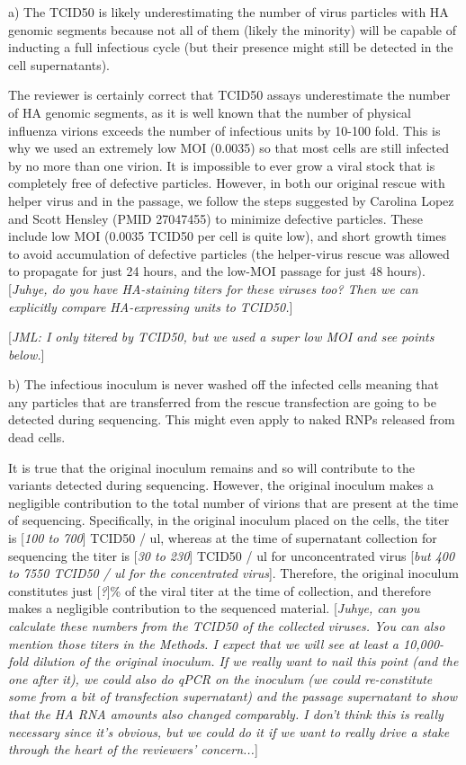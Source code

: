 \documentclass[11pt, oneside]{article}   	%
\newcommand{\comment}[1]{{\color{red}[\textsl{#1}]}}
\newcommand{\response}[1]{{\color{black}#1}}
\begin{document}
a) The TCID50 is likely underestimating the number of virus particles with HA genomic segments because not all of them (likely the minority) will be capable of inducting a full infectious cycle (but their presence might still be detected in the cell supernatants). 

\response{The reviewer is certainly correct that TCID50 assays underestimate the number of HA genomic segments, as it is well known that the number of physical influenza virions exceeds the number of infectious units by 10-100 fold.
This is why we used an extremely low MOI (0.0035) so that most cells are still infected by no more than one virion.
It is impossible to ever grow a viral stock that is completely free of defective particles.
However, in both our original rescue with helper virus and in the passage, we follow the steps suggested by Carolina Lopez and Scott Hensley (PMID 27047455) to minimize defective particles.
These include low MOI (0.0035 TCID50 per cell is quite low), and short growth times to avoid accumulation of defective particles (the helper-virus rescue was allowed to propagate for just 24 hours, and the low-MOI passage for just 48 hours).
\comment{Juhye, do you have HA-staining titers for these viruses too? Then we can explicitly compare HA-expressing units to TCID50.}
}

\comment{JML: I only titered by TCID50, but we used a super low MOI and see points below.}

b) The infectious inoculum is never washed off the infected cells meaning that any particles that are transferred from the rescue transfection are going to be detected during sequencing. This might even apply to naked RNPs released from dead cells. 

\response{It is true that the original inoculum remains and so will contribute to the variants detected during sequencing.
However, the original inoculum makes a negligible contribution to the total number of virions that are present at the time of sequencing.
Specifically, in the original inoculum placed on the cells, the titer is \comment{100 to 700} TCID50 / ul, whereas at the time of supernatant collection for sequencing the titer is \comment{30 to 230} TCID50 / ul for unconcentrated virus \comment{but 400 to 7550 TCID50 / ul for the concentrated virus}.
Therefore, the original inoculum constitutes just \comment{?}\% of the viral titer at the time of collection, and therefore makes a negligible contribution to the sequenced material.
\comment{Juhye, can you calculate these numbers from the TCID50 of the collected viruses. 
You can also mention those titers in the Methods.
I expect that we will see at least a 10,000-fold dilution of the original inoculum.
If we really want to nail this point (and the one after it), we could also do qPCR on the inoculum (we could re-constitute some from a bit of transfection supernatant) and the passage supernatant to show that the HA RNA amounts also changed comparably.
I don't think this is really necessary since it's obvious, but we could do it if we want to really drive a stake through the heart of the reviewers' concern...}
}
\end{document}
